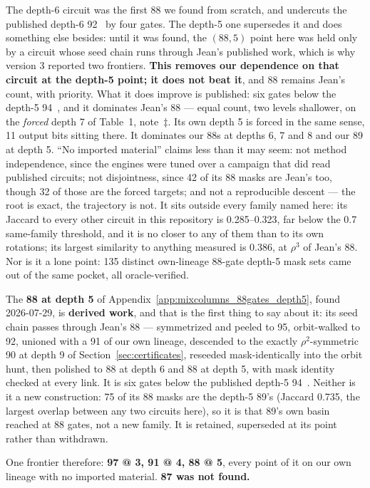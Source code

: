 \documentclass[11pt,a4paper]{article}
\begin{document}
The depth-6 circuit was the first 88 we found from scratch, and undercuts the
published depth-6 92~\cite{Max19,XZLBZ20} by four gates. The depth-5 one
supersedes it and does something else besides: until it was found, the $(88,5)$
point here was held only by a circuit whose seed chain runs through Jean's
published work, which is why version 3 reported two frontiers. \textbf{This
removes our dependence on that circuit at the depth-5 point; it does not beat
it}, and 88 remains Jean's count, with priority. What it does improve is
published: six gates below the depth-5 94~\cite{OC24}, and it dominates Jean's
88 --- equal count, two levels shallower, on the \emph{forced} depth 7 of
Table~1, note~$\ddagger$. Its own depth 5 is forced in the same sense, 11 output
bits sitting there. It dominates our 88s at depths 6, 7 and 8 and our 89 at
depth 5. ``No imported material'' claims less than it may seem: not method
independence, since the engines were tuned over a campaign that did read
published circuits; not disjointness, since 42 of its 88 masks are Jean's too,
though 32 of those are the forced targets; and not a reproducible descent --- the
root is exact, the trajectory is not. It sits outside every family named here:
its Jaccard to every other circuit in this repository is 0.285--0.323,
far below the 0.7 same-family threshold, and it is no closer to any of them
than to its own rotations; its largest similarity to anything measured is
0.386, at $\rho^3$ of Jean's 88. Nor is it a lone point: 135 distinct
own-lineage 88-gate depth-5 mask sets came out of the same pocket, all
oracle-verified.

The \textbf{88 at depth 5} of Appendix~\ref{app:mixcolumns_88gates_depth5},
found 2026-07-29, is \textbf{derived work}, and that is the first thing to say
about it: its seed chain passes through Jean's 88 --- symmetrized and peeled to
95, orbit-walked to 92, unioned with a 91 of our own lineage, descended to the
exactly $\rho^2$-symmetric 90 at depth 9 of
Section~\ref{sec:certificates}, reseeded mask-identically into the orbit hunt,
then polished to 88 at depth 6 and 88 at depth 5, with mask identity checked at
every link. It is six gates below the published depth-5 94~\cite{OC24}. Neither
is it a new construction: 75 of its 88 masks are the depth-5 89's (Jaccard
0.735, the largest overlap between any two circuits here), so it is that 89's
own basin reached at 88 gates, not a new family. It is retained, superseded at
its point rather than withdrawn.

One frontier therefore: \textbf{97 @ 3, 91 @ 4, 88 @ 5}, every point of it on
our own lineage with no imported material. \textbf{87 was not found.}
\end{document}

